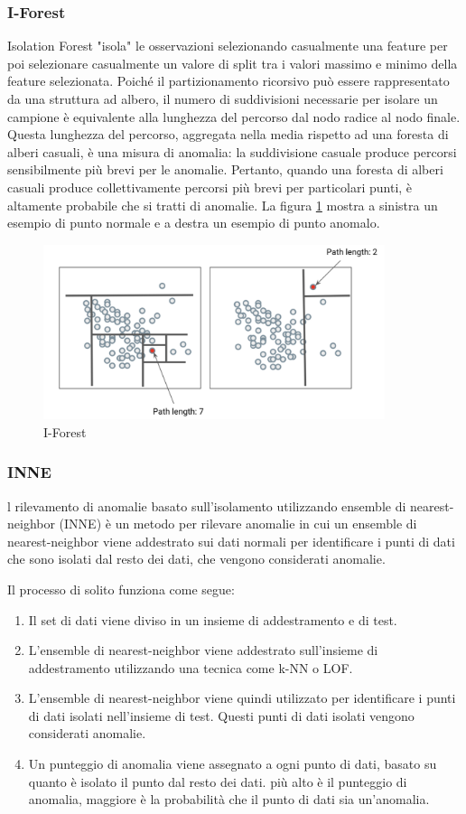 \subsubsection{I-Forest}
Isolation Forest "isola" le osservazioni selezionando casualmente una feature per poi selezionare casualmente un valore di split tra i valori massimo e minimo della feature selezionata. 
Poiché il partizionamento ricorsivo può essere rappresentato da una struttura ad albero, il numero di suddivisioni necessarie per isolare un campione è equivalente alla lunghezza del percorso dal nodo radice al nodo finale.
Questa lunghezza del percorso, aggregata nella media rispetto ad una foresta di alberi casuali, è una misura di anomalia: la suddivisione casuale produce percorsi sensibilmente più brevi per le anomalie. Pertanto, quando una foresta di alberi casuali produce collettivamente percorsi più brevi per particolari punti, è altamente probabile che si tratti di anomalie.
La figura \ref{iforest} mostra a sinistra un esempio di punto normale e a destra un esempio di punto anomalo.
\begin{figure}[t]
	\centering
	\includegraphics[width=10cm, scale=1]{images/iforest}
	\caption{I-Forest}
	\label{iforest}
\end{figure}
\subsubsection{INNE}
l rilevamento di anomalie basato sull'isolamento utilizzando ensemble di nearest-neighbor (INNE) è un metodo per rilevare anomalie in cui un ensemble di nearest-neighbor viene addestrato sui dati normali per identificare i punti di dati che sono isolati dal resto dei dati, che vengono considerati anomalie.

Il processo di solito funziona come segue:
\begin{enumerate}
\item Il set di dati viene diviso in un insieme di addestramento e di test.
\item L'ensemble di nearest-neighbor viene addestrato sull'insieme di addestramento utilizzando una tecnica come k-NN o LOF.
\item L'ensemble di nearest-neighbor viene quindi utilizzato per identificare i punti di dati isolati nell'insieme di test. Questi punti di dati isolati vengono considerati anomalie.
\item Un punteggio di anomalia viene assegnato a ogni punto di dati, basato su quanto è isolato il punto dal resto dei dati. più alto è il punteggio di anomalia, maggiore è la probabilità che il punto di dati sia un'anomalia.
\end{enumerate}

